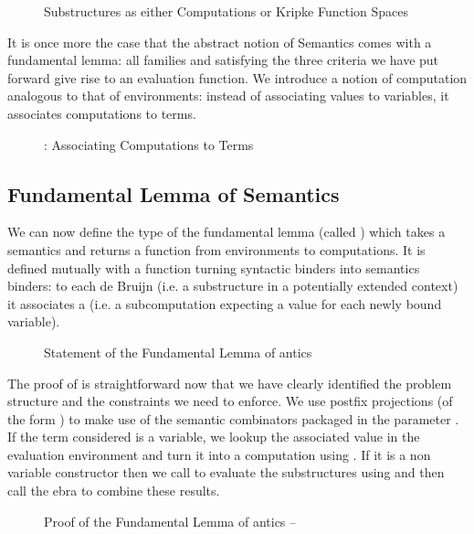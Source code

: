 \begin{figure}[h]
\caption{Substructures as either Computations or Kripke Function Spaces}
\end{figure}

It is once more the case that the abstract notion of Semantics comes
with a fundamental lemma: all   families  and
 satisfying the three criteria we have put forward give rise
to an evaluation function. We introduce a notion of computation
 analogous to that of environments: instead of associating
values to variables, it associates computations to terms.

\begin{figure}[h]
\caption{: Associating Computations to Terms}
\end{figure}

\subsection{Fundamental Lemma of Semantics}

We can now define the type of the fundamental lemma (called ) which
takes a semantics and returns a function from environments to computations.
It is defined mutually with a
function  turning syntactic binders into semantics binders: to
each de Bruijn  (i.e. a substructure in a potentially extended
context) it associates a  (i.e. a subcomputation expecting a
value for each newly bound variable).

\begin{figure}[h]
\caption{Statement of the Fundamental Lemma of antics}
\end{figure}

The proof of  is straightforward now that we have clearly
identified the problem structure and the constraints we need to enforce.
We use postfix projections (of the form ) to make use of
the semantic combinators packaged in the  parameter .
If the term considered is a variable, we lookup the associated value in
the evaluation environment and turn it into a computation using .
If it is a non variable constructor then we call  to evaluate the
substructures using  and then call the ebra to combine
these results.

\begin{figure}[h]
\caption{Proof of the Fundamental Lemma of antics -- }
\end{figure}

